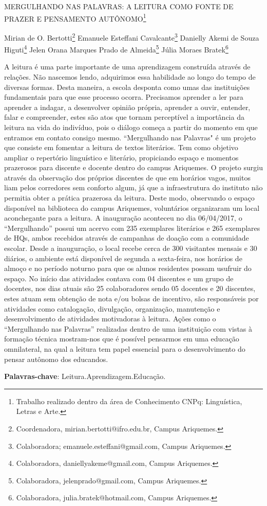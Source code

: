\documentclass[article,12pt,onesidea,4paper,english,brazil]{abntex2}
\begin{document}
	
	
	\frenchspacing 
	
	\begin{center}
		\LARGE MERGULHANDO NAS PALAVRAS: A LEITURA COMO FONTE DE PRAZER E
		PENSAMENTO AUTÔNOMO\footnote{Trabalho realizado dentro da área de Conhecimento CNPq: Linguística, Letras e Arte.}
		
		\normalsize
	Mirian de O. Bertotti\footnote{Coordenadora, mirian.bertotti@ifro.edu.br, Campus Ariquemes.} 
	Emanuele Esteffani Cavalcante\footnote{Colaboradora; emanuele.esteffani@gmail.com, Campus Ariquemes.} 
	Danielly Akemi de Souza Higuti\footnote{Colaboradora, daniellyakeme@gmail.com, Campus Ariquemes.} 
	Jelen Orana Marques Prado de Almeida\footnote{Colaboradora, jelenprado@gmail.com, Campus Ariquemes.} 
     Júlia Moraes Bratek\footnote{Colaboradora, julia.bratek@hotmail.com, Campus Ariquemes.} 
	\end{center}
	
	\noindent A leitura é uma parte importante de uma aprendizagem construída através de
	relações. Não nascemos lendo, adquirimos essa habilidade ao longo do tempo de
	diversas formas. Desta maneira, a escola desponta como umas das instituições
	fundamentais para que esse processo ocorra. Precisamos aprender a ler para
	aprender a indagar, a desenvolver opinião própria, aprender a ouvir, entender, falar
	e compreender, estes são atos que tornam perceptível a importância da leitura na
	vida do indivíduo, pois o diálogo começa a partir do momento em que entramos em
	contato consigo mesmo. “Mergulhando nas Palavras" é um projeto que consiste em
	fomentar a leitura de textos literários. Tem como objetivo ampliar o repertório
	linguístico e literário, propiciando espaço e momentos prazerosos para discente e
	docente dentro do campus Ariquemes. O projeto surgiu através da observação dos
	próprios discentes de que em horários vagos, muitos liam pelos corredores sem
	conforto algum, já que a infraestrutura do instituto não permitia obter a prática
	prazerosa da leitura. Deste modo, observando o espaço disponível na biblioteca do
	campus Ariquemes, voluntários organizaram um local aconchegante para a leitura. A
	inauguração aconteceu no dia 06/04/2017, o “Mergulhando” possui um acervo com
	235 exemplares literários e 265 exemplares de HQs, ambos recebidos através de
	campanhas de doação com a comunidade escolar. Desde a inauguração, o local
	recebe cerca de 300 visitantes mensais e 30 diários, o ambiente está disponível de
	segunda a sexta-feira, nos horários de almoço e no período noturno para que os
	alunos residentes possam usufruir do espaço. No início das atividades contava com
	04 discentes e um grupo de docentes, nos dias atuais são 25 colaboradores sendo
	05 docentes e 20 discentes, estes atuam sem obtenção de nota e/ou bolsas de
	incentivo, são responsáveis por atividades como catalogação, divulgação,
	organização, manutenção e desenvolvimento de atividades motivadoras à leitura.
	Ações como o “Mergulhando nas Palavras” realizadas dentro de uma instituição com
	vistas à formação técnica mostram-nos que é possível pensarmos em uma
	educação omnilateral, na qual a leitura tem papel essencial para o desenvolvimento
	do pensar autônomo dos educandos.
	
	\vspace{\onelineskip}
	
	\noindent
	\textbf{Palavras-chave}: Leitura.Aprendizagem.Educação.
	
\end{document}

